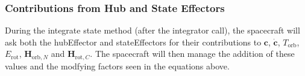 \subsubsection{Contributions from Hub and State Effectors}
During the integrate state method (after the integrator call), the spacecraft will ask both the hubEffector and stateEffectors for their contributions to $\bm c$, $\dot{\bm c}$, $T_{\text{orb}}$, $E_{\text{rot}}$, $\bm H_{\text{orb},N}$ and $\bm H_{\text{rot},C}$. The spacecraft will then manage the addition of these values and the modfying factors seen in the equations above.
